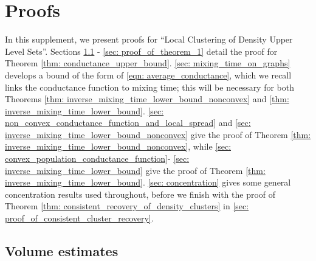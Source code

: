 \documentclass{article}
\newcommand{\1}{\mathbf{1}}
\theoremstyle{aldenthm}
\begin{document}








\section{Proofs}

In this supplement, we present proofs for ``Local Clustering of Density Upper Level Sets''. Sections \ref{sec: volume_estimates} - \ref{sec: proof_of_theorem_1} detail the proof for Theorem \ref{thm: conductance_upper_bound}. \ref{sec: mixing_time_on_graphs} develops a bound of the form of \eqref{eqn: average_conductance}, which we recall links the conductance function to mixing time; this will be necessary for both Theorems \ref{thm: inverse_mixing_time_lower_bound_nonconvex} and \ref{thm: inverse_mixing_time_lower_bound}. \ref{sec: non_convex_conductance_function_and_local_spread} and \ref{sec: inverse_mixing_time_lower_bound_nonconvex} give the proof of Theorem \ref{thm: inverse_mixing_time_lower_bound_nonconvex}, while \ref{sec: convex_population_conductance_function}- \ref{sec: inverse_mixing_time_lower_bound} give the proof of Theorem \ref{thm: inverse_mixing_time_lower_bound}. \ref{sec: concentration} gives some general concentration results used throughout, before we finish with the proof of Theorem \ref{thm: consistent_recovery_of_density_clusters} in \ref{sec: proof_of_consistent_cluster_recovery}.

\subsection{Volume estimates}
\label{sec: volume_estimates}
\end{document}
